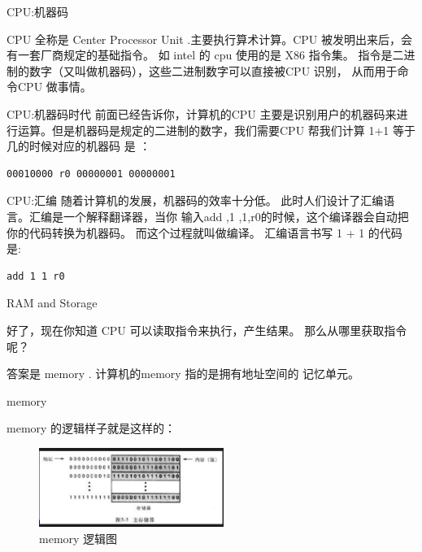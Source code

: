 \documentclass[10pt]{beamer}
\begin{document}
\begin{frame}[fragile]{CPU:机器码 }

CPU 全称是 Center Processor Unit .主要执行算术计算。CPU 被发明出来后，会有一套厂商规定的基础指令。
如 intel 的 cpu 使用的是 X86 指令集。 指令是二进制的数字（又叫做机器码），这些二进制数字可以直接被CPU 识别，
从而用于命令CPU 做事情。
\end{frame}
\begin{frame}[fragile]{CPU:机器码时代 }
前面已经告诉你，计算机的CPU 主要是识别用户的机器码来进行运算。但是机器码是规定的二进制的数字，我们需要CPU
帮我们计算 1+1 等于几的时候对应的机器码 是 ：
\begin{verbatim}
00010000 r0 00000001 00000001
\end{verbatim}
\end{frame}

\begin{frame}[fragile]{CPU:汇编 }
随着计算机的发展，机器码的效率十分低。 此时人们设计了汇编语言。汇编是一个解释翻译器，当你
输入add ,1 ,1,r0的时候，这个编译器会自动把你的代码转换为机器码。 而这个过程就叫做编译。
汇编语言书写 1 + 1 的代码是:
\begin{lstlisting}
add 1 1 r0
\end{lstlisting}

\end{frame}


\begin{frame}[fragile]{RAM and Storage }

好了，现在你知道 CPU 可以读取指令来执行，产生结果。
那么从哪里获取指令呢？

答案是 memory .  计算机的memory 指的是拥有地址空间的
记忆单元。
\end{frame}

\begin{frame}[fragile]{memory}

memory 的逻辑样子就是这样的：
\begin{figure}[htbp]
\begin{center}
\includegraphics[width=6cm]{img/memory}
\caption{memory 逻辑图}
\label{memory}
\end{center}
\vspace{-0.5em}
\end{figure}

\end{frame}
\end{document}
